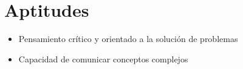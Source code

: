 \documentclass[letterpaper,11pt]{article}
\newcommand{\resumeItem}[1]{%
  \item\small{
    #1
  }
}
\newcommand{\resumeSubItem}[2]{\resumeItem{#1}{#2}\vspace{-4pt}}
\newcommand{\resumeSubHeadingListStart}{\begin{itemize}[leftmargin=*]}
\newcommand{\resumeSubHeadingListEnd}{\end{itemize}}
\begin{document}
		\section{Aptitudes}
		\resumeSubHeadingListStart
		\resumeSubItem{Pensamiento crítico y orientado a la solución de 
			problemas}
		
		\resumeSubItem{Disciplina y perseverancia}
		
		\resumeSubItem{Capacidad de comunicar conceptos complejos}
		
		\resumeSubItem{Curiosidad intelectual y aprendizaje continuo}
		
		\resumeSubHeadingListEnd
		
		\vspace{1em}





\end{document}
